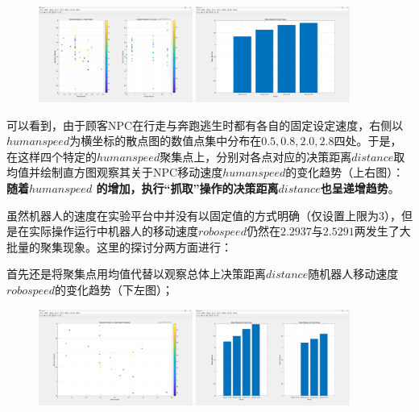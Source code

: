 \documentclass[12pt]{article}  %
\begin{document}
	\begin{figure}[H]
		\centering
		\includegraphics[width=0.45\textwidth]{3.png}
		\includegraphics[width=0.45\textwidth]{4.png}
	\end{figure}
	
	可以看到，由于顾客NPC在行走与奔跑逃生时都有各自的固定设定速度，右侧以$humanspeed$为横坐标的散点图的数值点集中分布在$0.5,0.8,2.0,2.8$四处。于是，在这样四个特定的$humanspeed$聚集点上，分别对各点对应的决策距离$distance$取均值并绘制直方图观察其关于NPC移动速度$humanspeed$的变化趋势（上右图）：\textbf{随着$humanspeed$ 的增加，执行“抓取”操作的决策距离$distance$也呈递增趋势}。
	
	虽然机器人的速度在实验平台中并没有以固定值的方式明确（仅设置上限为3），但是在实际操作运行中机器人的移动速度$robospeed$仍然在$2.2937$与$2.5291$两发生了大批量的聚集现象。这里的探讨分两方面进行：
	
	首先还是将聚集点用均值代替以观察总体上决策距离$distance$随机器人移动速度 $robospeed$的变化趋势（下左图）；
	
	\begin{figure}[H]
		\centering
		\includegraphics[width=0.45\textwidth]{5.png}
		\includegraphics[width=0.45\textwidth]{6.png}
	\end{figure}
	
\end{document}
